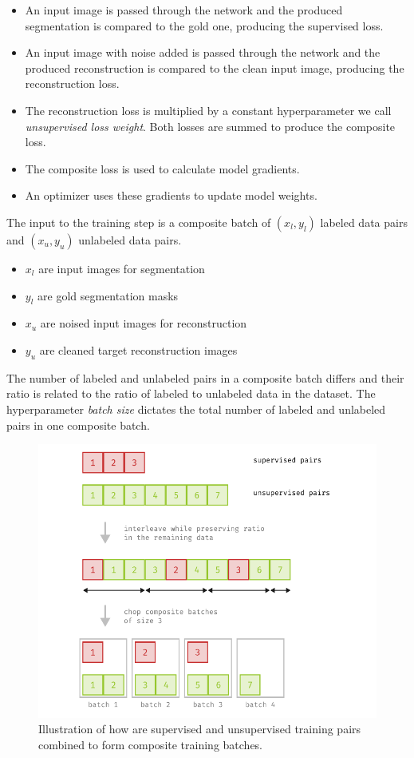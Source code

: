\begin{itemize}
    \item An input image is passed through the network and the produced segmentation is compared to the gold one, producing the supervised loss.
    \item An input image with noise added is passed through the network and the produced reconstruction is compared to the clean input image, producing the reconstruction loss.
    \item The reconstruction loss is multiplied by a constant hyperparameter we call \emph{unsupervised loss weight}. Both losses are summed to produce the composite loss.
    \item The composite loss is used to calculate model gradients.
    \item An optimizer uses these gradients to update model weights.
\end{itemize}

The input to the training step is a composite batch of $(x_l, y_l)$ labeled data pairs and $(x_u, y_u)$ unlabeled data pairs.

\begin{itemize}
    \item $x_l$ are input images for segmentation
    \item $y_l$ are gold segmentation masks
    \item $x_u$ are noised input images for reconstruction
    \item $y_u$ are cleaned target reconstruction images
\end{itemize}

The number of labeled and unlabeled pairs in a composite batch differs and their ratio is related to the ratio of labeled to unlabeled data in the dataset. The hyperparameter \emph{batch size} dictates the total number of labeled and unlabeled pairs in one composite batch.

\begin{figure}[ht]
    \centering
    \includegraphics[width=140mm]{../img/batching-process.pdf}
    \caption{Illustration of how are supervised and unsupervised training pairs combined to form composite training batches.}
    \label{fig:CompositeBatching}
\end{figure}

